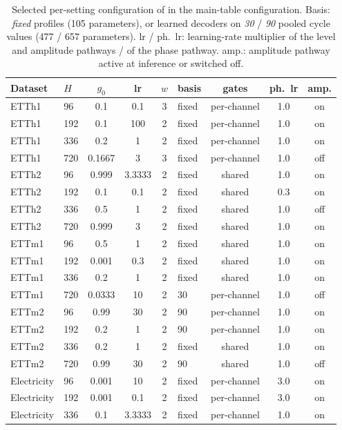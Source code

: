 {\begin{table}[t]
\centering
\caption{Selected per-setting configuration of \sysplus in the main-table configuration. Basis: \emph{fixed} profiles (105 parameters), or learned decoders on \emph{30} / \emph{90} pooled cycle values (477 / 657 parameters). lr / ph.~lr: learning-rate multiplier of the level and amplitude pathways / of the phase pathway. amp.: amplitude pathway active at inference or switched off.}
\label{tab:la_config}
\footnotesize
\setlength{\tabcolsep}{2.6pt}
\begin{tabular}{llccclccc}
\toprule
Dataset & $H$ & $g_0$ & lr & $w$ & basis & gates & ph.~lr & amp. \\
\midrule
ETTh1 & 96 & 0.1 & 0.1 & 3 & fixed & per-channel & 1.0 & on \\
ETTh1 & 192 & 0.1 & 100 & 2 & fixed & per-channel & 1.0 & on \\
ETTh1 & 336 & 0.2 & 1 & 2 & fixed & per-channel & 1.0 & on \\
ETTh1 & 720 & 0.1667 & 3 & 3 & fixed & per-channel & 1.0 & off \\
ETTh2 & 96 & 0.999 & 3.3333 & 2 & fixed & shared & 1.0 & on \\
ETTh2 & 192 & 0.1 & 0.1 & 2 & fixed & shared & 0.3 & on \\
ETTh2 & 336 & 0.5 & 1 & 2 & fixed & shared & 1.0 & off \\
ETTh2 & 720 & 0.999 & 3 & 2 & fixed & shared & 1.0 & on \\
ETTm1 & 96 & 0.5 & 1 & 2 & fixed & shared & 1.0 & on \\
ETTm1 & 192 & 0.001 & 0.3 & 2 & fixed & shared & 1.0 & on \\
ETTm1 & 336 & 0.2 & 1 & 2 & fixed & shared & 1.0 & on \\
ETTm1 & 720 & 0.0333 & 10 & 2 & 30 & per-channel & 1.0 & off \\
ETTm2 & 96 & 0.99 & 30 & 2 & 90 & per-channel & 1.0 & on \\
ETTm2 & 192 & 0.2 & 1 & 2 & 90 & per-channel & 1.0 & on \\
ETTm2 & 336 & 0.2 & 1 & 2 & fixed & shared & 1.0 & on \\
ETTm2 & 720 & 0.99 & 30 & 2 & 90 & shared & 1.0 & off \\
Electricity & 96 & 0.001 & 10 & 2 & fixed & per-channel & 3.0 & on \\
Electricity & 192 & 0.001 & 0.1 & 2 & fixed & per-channel & 3.0 & on \\
Electricity & 336 & 0.1 & 3.3333 & 2 & fixed & per-channel & 1.0 & on \\

\end{tabular}
\end{table}}
